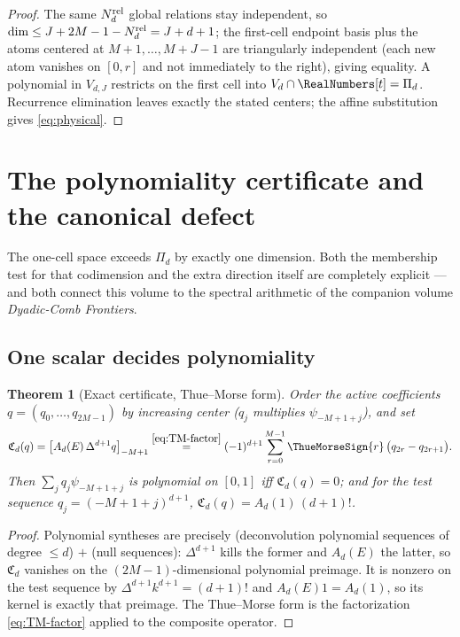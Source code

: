 \documentclass[11pt,oneside]{article}
\numberwithin{equation}{section}
\newtheorem{theorem}{Theorem}[section]
\theoremstyle{definition}
\theoremstyle{remark}
\newcommand{\PiD}{\Pi_d}
\begin{document}
\begin{proof}
The same $N_d^{\rm rel}$ global relations stay independent, so
$\dim\le J+2M-1-N_d^{\rm rel}=J+d+1$; the first-cell endpoint basis plus the
atoms centered at $M+1,\dots,M+J-1$ are triangularly independent
(each new atom vanishes on $[0,r]$ and not immediately to the right),
giving equality.  A polynomial in $V_{d,J}$ restricts on the first
cell into $V_d\cap\RealNumbers[t]=\PiD$.  Recurrence elimination leaves exactly
the stated centers; the affine substitution gives
\eqref{eq:physical}.
\end{proof}

\section{The polynomiality certificate and the canonical defect}
\label{sec:certificate}

The one-cell space exceeds $\PiD$ by exactly one dimension.  Both the
membership test for that codimension and the extra direction itself
are completely explicit --- and both connect this volume to the
spectral arithmetic of the companion volume \emph{Dyadic-Comb
Frontiers}.

\subsection{One scalar decides polynomiality}

\begin{theorem}[Exact certificate, Thue--Morse form]
\label{thm:certificate}
Order the active coefficients $q=(q_0,\dots,q_{2M-1})$ by increasing
center ($q_j$ multiplies $\psi_{-M+1+j}$), and set
\begin{equation}
 \mathfrak C_d(q)
 =\bigl[A_d(E)\,\Delta^{d+1}q\bigr]_{-M+1}
 \overset{\eqref{eq:TM-factor}}{=}
 (-1)^{d+1}\sum_{r=0}^{M-1}\ThueMorseSign{r}\,
 \bigl(q_{2r}-q_{2r+1}\bigr).
 \label{eq:certificate-functional}
\end{equation}
Then $\sum_jq_j\psi_{-M+1+j}$ is polynomial on $[0,1]$ \emph{iff}
$\mathfrak C_d(q)=0$; and for the test sequence
$q_j=(-M+1+j)^{d+1}$,
$\mathfrak C_d(q)=A_d(1)\,(d+1)!$.
\end{theorem}

\begin{proof}
Polynomial syntheses are precisely (deconvolution polynomial
sequences of degree $\le d$) $+$ (null sequences):
$\Delta^{d+1}$ kills the former and $A_d(E)$ the latter, so
$\mathfrak C_d$ vanishes on the $(2M-1)$-dimensional polynomial
preimage.  It is nonzero on the test sequence by
$\Delta^{d+1}k^{d+1}=(d+1)!$ and $A_d(E)1=A_d(1)$, so its kernel is
exactly that preimage.  The Thue--Morse form is the factorization
\eqref{eq:TM-factor} applied to the composite operator.
\end{proof}
\end{document}
